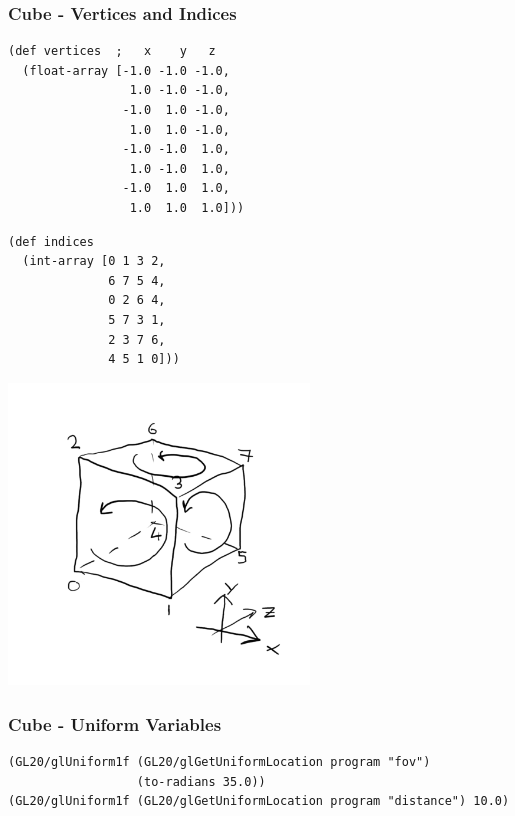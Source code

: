 \documentclass[aspectratio=169,11pt,xcolor=dvipsnames]{beamer}
\begin{document}
\begin{frame}[fragile]
  \frametitle{Cube {-} Vertices and Indices}
  \begin{minipage}[c]{.48\textwidth}
    \begin{verbatim}
(def vertices  ;   x    y   z
  (float-array [-1.0 -1.0 -1.0,
                 1.0 -1.0 -1.0,
                -1.0  1.0 -1.0,
                 1.0  1.0 -1.0,
                -1.0 -1.0  1.0,
                 1.0 -1.0  1.0,
                -1.0  1.0  1.0,
                 1.0  1.0  1.0]))
    \end{verbatim}
  \end{minipage}
  \begin{minipage}[c]{.48\textwidth}
    \begin{verbatim}
(def indices
  (int-array [0 1 3 2,
              6 7 5 4,
              0 2 6 4,
              5 7 3 1,
              2 3 7 6,
              4 5 1 0]))
    \end{verbatim}
    \begin{center}
      \includegraphics[width=0.6\textwidth]{cubecoords}
    \end{center}
  \end{minipage}
\end{frame}

\begin{frame}[fragile]
  \frametitle{Cube {-} Uniform Variables}
  \begin{verbatim}
(GL20/glUniform1f (GL20/glGetUniformLocation program "fov")
                  (to-radians 35.0))
(GL20/glUniform1f (GL20/glGetUniformLocation program "distance") 10.0)
  \end{verbatim}
\end{frame}
\end{document}
